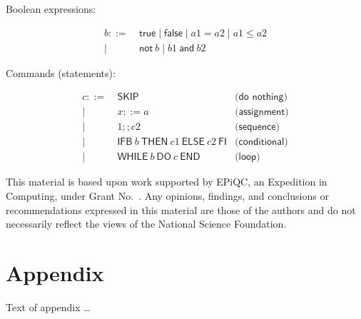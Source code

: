 \documentclass[sigplan,10pt,review,anonymous]{acmart}\settopmatter{printfolios=true,printccs=false,printacmref=false}
\begin{document}
Boolean expressions:

\begin{align*}
	b ::=&\ \textsf{true} \mid \textsf{false} \mid a1 = a2 \mid a1 \le a2\\
	\mid&\ \textsf{not}\ b \mid b1\ \textsf{and}\ b2
\end{align*}

Commands (statements):

\begin{align*}
	c ::=&\ \textsf{SKIP} 														&\textsf{(do\ nothing)}\\
	\mid&\ x ::= a 															&\textsf{(assignment)}\\
	\mid&\ 1; ; c2 															&\textsf{(sequence)}\\
	\mid&\ \textsf{IFB}\ b\ \textsf{THEN}\ c1\ \textsf{ELSE}\ c2\ \textsf{FI} 	&\textsf{(conditional)}\\
	\mid&\ \textsf{WHILE}\ b\ \textsf{DO}\ c\ \textsf{END} 					&\textsf{(loop)}
\end{align*}

\cite{DBLP:conf/oopsla/HuangM18}

\cite{Huang:2019:SAV:3307650.3322213}

\cite{nanevski_morrisett_birkedal_2008}

\cite{paykin18}

\cite{rand18}

\cite{2015arXiv151002198R}


\begin{acks}                            %
  This material is based upon work supported by
  EPiQC, an 
  Expedition in Computing, under Grant
  No.~.  Any opinions, findings, and
  conclusions or recommendations expressed in this material are those
  of the authors and do not necessarily reflect the views of the
  National Science Foundation.
\end{acks}





\appendix
\section{Appendix}

Text of appendix \ldots
\end{document}
